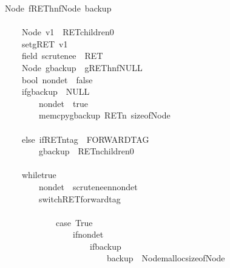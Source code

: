 \documentclass{book}
\theoremstyle{definition}
\begin{document}
\begin{figure}
\begin{tabbing}\ttfamily
~Node~fREThnfNode~backup\\
\ttfamily ~\\
\ttfamily ~~~~~Node~v1~~RETchildren0\\
\ttfamily ~~~~~setgRET~v1\\
\ttfamily ~~~~~field~scrutenee~~RET\\
\ttfamily ~~~~~Node~gbackup~~gREThnfNULL\\
\ttfamily ~~~~~bool~nondet~~false\\
\ttfamily ~~~~~ifgbackup~~NULL~\\
\ttfamily ~~~~~~~~~nondet~~true\\
\ttfamily ~~~~~~~~~memcpygbackup~RETn~sizeofNode\\
\ttfamily ~~~~~\\
\ttfamily ~~~~~else~ifRETntag~~FORWARDTAG~\\
\ttfamily ~~~~~~~~~gbackup~~RETnchildren0\\
\ttfamily ~~~~~\\
\ttfamily ~~~~~whiletrue~\\
\ttfamily ~~~~~~~~~nondet~~scruteneennondet\\
\ttfamily ~~~~~~~~~switchRETforwardtag~\\
\ttfamily ~~~~~~~~~~~~~\\
\ttfamily ~~~~~~~~~~~~~case~True\\
\ttfamily ~~~~~~~~~~~~~~~~~ifnondet~\\
\ttfamily ~~~~~~~~~~~~~~~~~~~~~ifbackup~\\
\ttfamily ~~~~~~~~~~~~~~~~~~~~~~~~~backup~~NodemallocsizeofNode\\

\end{tabbing}
\end{figure}
\end{document}
